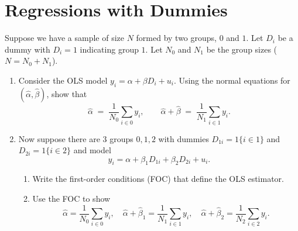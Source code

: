 \documentclass[12pt]{article}
\numberwithin{equation}{section}
\begin{document}
\bigskip

\section{Regressions with Dummies}  %
Suppose we have a sample of size $N$ formed by two groups, $0$ and $1$.
Let $D_i$ be a dummy with $D_i=1$ indicating group $1$. Let $N_0$ and $N_1$ be the group sizes ($N=N_0+N_1$).
\begin{enumerate}[label=\alph*)]
  \item Consider the OLS model $y_i=\alpha+\beta D_i+u_i$. Using the normal equations for $(\hat\alpha,\hat\beta)$, show that
  \[
    \hat\alpha \;=\; \frac{1}{N_0}\sum_{i\in 0} y_i,
    \qquad
    \hat\alpha+\hat\beta \;=\; \frac{1}{N_1}\sum_{i\in 1} y_i.
  \]
  \item Now suppose there are 3 groups $0,1,2$ with dummies $D_{1i}=1\{i\in 1\}$ and $D_{2i}=1\{i\in 2\}$ and model
  \[
    y_i=\alpha+\beta_1 D_{1i}+\beta_2 D_{2i}+u_i.
  \]
  \begin{enumerate}[label=\roman*.]
    \item Write the first-order conditions (FOC) that define the OLS estimator.
    \item Use the FOC to show
      \[
      \hat\alpha=\frac{1}{N_0}\sum_{i\in 0}y_i,\quad
      \hat\alpha+\hat\beta_1=\frac{1}{N_1}\sum_{i\in 1}y_i,\quad
      \hat\alpha+\hat\beta_2=\frac{1}{N_2}\sum_{i\in 2}y_i.
      \]
  \end{enumerate}
\end{enumerate}
\end{document}
